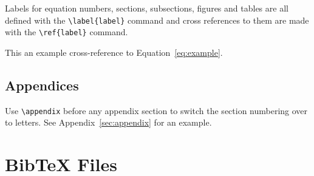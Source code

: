 \documentclass[11pt]{article}
\begin{document}
Labels for equation numbers, sections, subsections, figures and tables
are all defined with the \verb|\label{label}| command and cross references
to them are made with the \verb|\ref{label}| command.

This an example cross-reference to Equation~\ref{eq:example}.

\subsection{Appendices}

Use \verb|\appendix| before any appendix section to switch the section numbering over to letters. See Appendix~\ref{sec:appendix} for an example.

\section{Bib\TeX{} Files}
\label{sec:bibtex}
\end{document}
